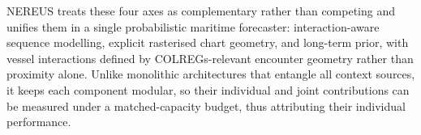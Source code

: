\documentclass[runningheads]{preamp/llncs}
\begin{document}

\ac{NEREUS}
treats these four axes as complementary rather than competing
and
unifies them in a single probabilistic maritime forecaster:
interaction-aware sequence modelling,
explicit rasterised chart geometry,
and
long-term prior,
with
vessel interactions defined by \ac{COLREGs}-relevant encounter geometry
rather than proximity alone.
%
Unlike monolithic architectures that entangle all context sources,
it keeps each component modular,
so their individual and joint contributions can be measured
under a matched-capacity budget,
thus attributing their individual performance.

\end{document}
